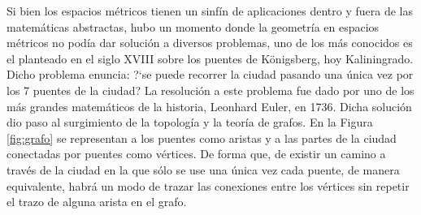 Si bien los espacios métricos tienen un sinfín de aplicaciones dentro y fuera
de las matemáticas abstractas, hubo un momento donde la geometría en espacios
métricos no podía dar solución a diversos problemas, uno de los más conocidos
es el planteado en el siglo XVIII sobre los puentes de K\"onigsberg, hoy
Kaliningrado.  Dicho problema enuncia: ?`se puede recorrer la ciudad pasando
una única vez por los 7 puentes de la ciudad? La resolución a este problema fue
dado por uno de los más grandes matemáticos de la historia, Leonhard Euler, en
1736. Dicha solución dio paso al surgimiento de la topología y la teoría de
grafos. En la Figura \ref{fig:grafo} se representan a los puentes como aristas
y a las partes de la ciudad conectadas por puentes como vértices. De forma que,
de existir un camino a través de la ciudad en la que sólo se use una única vez
cada puente, de manera equivalente, habrá un modo de trazar las conexiones
entre los vértices sin repetir el trazo de alguna arista en el grafo. 
